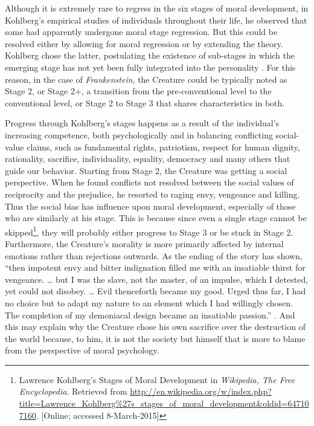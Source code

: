 \begin{text}

Although it is extremely rare to regress in the six stages of moral development, in Kohlberg's empirical studies of individuals throughout their life, he observed that some had apparently undergone moral stage regression. But this could be resolved either by allowing for moral regression or by extending the theory. Kohlberg chose the latter, postulating the existence of sub-stages in which the emerging stage has not yet been fully integrated into the personality \citep{kohlberg1976moral}. For this reason, in the case of \textit{Frankenstein}, the Creature could be typically noted as Stage 2\textonehalf{}, or Stage 2+, a transition from the pre-conventional level to the conventional level, or Stage 2 to Stage 3 that shares characteristics in both.

Progress through Kohlberg's stages happens as a result of the individual's increasing competence, both psychologically and in balancing conflicting social-value claims, such as fundamental rights, patriotism, respect for human dignity, rationality, sacrifice, individuality, equality, democracy and many others that guide our behavior. Starting from Stage 2, the Creature was getting a social perspective. When he found conflicts not resolved between the social values of reciprocity and the prejudice, he resorted to raging envy, vengeance and killing. Thus the social bias has influence upon moral development, especially of those who are similarly at his stage. This is because since even a single stage cannot be skipped\footnote{Lawrence Kohlberg's Stages of Moral Development in \textit{Wikipedia{,} The Free Encyclopedia}. Retrieved from \url{http://en.wikipedia.org/w/index.php?title=Lawrence_Kohlberg\%27s_stages_of_moral_development&oldid=647107160}. [Online; accessed 8-March-2015]}, they will probably either progress to Stage 3 or be stuck in Stage 2\textonehalf. Furthermore, the Creature's morality is more primarily affected by internal emotions rather than rejections outwards. As the ending of the story has shown, ``then impotent envy and bitter indignation filled me with an insatiable thirst for vengeance. \dots{} but I was the slave, not the master, of an impulse, which I detested, yet could not disobey. \dots{} Evil thenceforth became my good. Urged thus far, I had no choice but to adapt my nature to an element which I had willingly chosen. The completion of my demoniacal design became an insatiable passion.'' . And this may explain why the Creature chose his own sacrifice over the destruction of the world because, to him, it is not the society but himself that is more to blame from the perspective of moral psychology.


\end{text}
